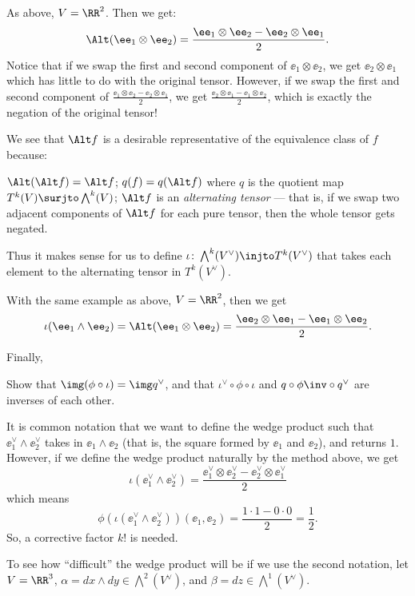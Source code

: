\begin{example}
	As above, $V = \RR^2$. Then we get:
	\[ \Alt (\ee_1 \otimes \ee_2) = \frac{\ee_1 \otimes \ee_2 - \ee_2 \otimes \ee_1}{2}. \]
	Notice that if we swap the first and second component of $\ee_1 \otimes \ee_2$, we get $\ee_2
	\otimes \ee_1$ which has little to do with the original tensor. However, if we swap
	the first and second component of $\frac{\ee_1 \otimes \ee_2 - \ee_2 \otimes \ee_1}{2}$, we get
	$\frac{\ee_2 \otimes \ee_1 - \ee_1 \otimes \ee_2}{2}$, which is exactly the negation of the
	original tensor!
\end{example}

We see that $\Alt f$ is a desirable representative of the equivalence class of $f$ because:
\begin{itemize}
	\ii $\Alt (\Alt f) = \Alt f$;
	\ii $q(f) = q(\Alt f)$ where $q$ is the quotient map $T^k(V) \surjto \bigwedge^k(V)$;
	\ii $\Alt f$ is an \emph{alternating tensor} --- that is, if we swap two adjacent components
	of $\Alt f$ for each pure tensor, then the whole tensor gets negated.
\end{itemize}
Thus it makes sense for us to define $\iota \colon \bigwedge^k(V^\vee) \injto T^k(V^\vee)$
that takes each element to the alternating tensor in $T^k(V^\vee)$.
\begin{example}
	With the same example as above, $V = \RR^2$, then we get
	\[
		\iota(\ee_1 \wedge \ee_2) = \Alt(\ee_1 \otimes \ee_2)
		= \frac{\ee_2 \otimes \ee_1 - \ee_1 \otimes \ee_2}{2}.
	\]
\end{example}
Finally,
\begin{exercise}
	Show that $\img (\phi \circ \iota) = \img q^\vee$, and that
	$\iota^\vee \circ \phi \circ \iota$ and $q \circ \phi\inv \circ q^\vee$
	are inverses of each other.
\end{exercise}

It is common notation that we want to define the wedge product such that
$\ee_1^\vee \wedge \ee_2^\vee$ takes in $\ee_1 \wedge \ee_2$ (that is, the square formed by $\ee_1$
and $\ee_2$), and returns $1$. However, if we define the wedge product naturally by the method
above, we get
\[
	\iota(\ee_1^\vee \wedge \ee_2^\vee)
	= \frac{\ee_1^\vee \otimes \ee_2^\vee - \ee_2^\vee \otimes \ee_1^\vee}{2}
\]
which means
\[
	\phi(\iota(\ee_1^\vee \wedge \ee_2^\vee))(\ee_1, \ee_2)
	= \frac{1 \cdot 1 - 0 \cdot 0}{2} = \frac{1}{2}.
\]
So, a corrective factor $k!$ is needed.

To see how ``difficult'' the wedge product will be if we use the second notation, let $V = \RR^3$,
$\alpha = dx \wedge dy \in \bigwedge^2(V^\vee)$, and $\beta = dz \in \bigwedge^1(V^\vee)$.


